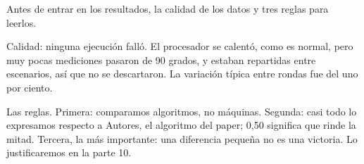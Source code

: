 Antes de entrar en los resultados, la calidad de los datos y tres reglas para leerlos.

Calidad: ninguna ejecución falló. El procesador se calentó, como es normal, pero muy pocas mediciones pasaron de 90 grados, y estaban repartidas entre escenarios, así que no se descartaron. La variación típica entre rondas fue del uno por ciento.

Las reglas. Primera: comparamos algoritmos, no máquinas. Segunda: casi todo lo expresamos respecto a Autores, el algoritmo del paper; 0,50 significa que rinde la mitad. Tercera, la más importante: una diferencia pequeña no es una victoria. Lo justificaremos en la parte 10.
